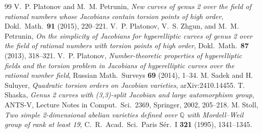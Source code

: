 \documentclass[10pt]{amsart}
\begin{document}
\begin{thebibliography}{99}
 V.~P. Platonov and M.~M. Petrunin, \emph{New curves of genus 2 over the field of rational numbers whose Jacobians contain torsion points of high order}, Dokl.\ Math.\ \textbf{91} (2015), 220--221.
 V.~P. Platonov, V.~S. Zhgun, and M.~M. Petrunin, \emph{On the simplicity of Jacobians for hyperelliptic curves of genus 2 over the field of rational numbers with torsion points of high order}, Dokl.\ Math.\ \textbf{87} (2013), 318--321.
 V.~P. Platonov, \emph{Number-theoretic properties of hyperelliptic fields and the torsion problem in Jacobians of hyperelliptic curves over the rational number field}, Russian Math.\ Surveys \textbf{69} (2014), 1--34.
 M. Sadek and H. Suluyer, \emph{Quadratic torsion orders on Jacobian varieties}, arXiv:2410.14455.
 T. Shaska, \emph{Genus 2 curves with (3,3)-split Jacobian and large automorphism group}, ANTS-V, Lecture Notes in Comput.\ Sci.\ 2369, Springer, 2002, 205--218.
 M. Stoll, \emph{Two simple 2-dimensional abelian varieties defined over $\mathbb{Q}$ with Mordell--Weil group of rank at least 19}, C.~R.\ Acad.\ Sci.\ Paris S\'er.\ I \textbf{321} (1995), 1341--1345.
\end{thebibliography}
\end{document}
